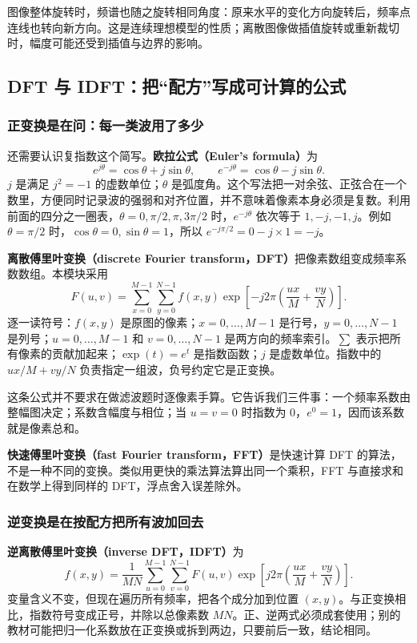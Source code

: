 图像整体旋转时，频谱也随之旋转相同角度：原来水平的变化方向旋转后，频率点连线也转向新方向。这是连续理想模型的性质；离散图像做插值旋转或重新裁切时，幅度可能还受到插值与边界的影响。

\subsection{DFT 与 IDFT：把“配方”写成可计算的公式}

\subsubsection{正变换是在问：每一类波用了多少}
还需要认识复指数这个简写。\textbf{欧拉公式（Euler's formula）}为
\[
e^{j\theta}=\cos\theta+j\sin\theta,\qquad
e^{-j\theta}=\cos\theta-j\sin\theta.
\]
$j$ 是满足 $j^2=-1$ 的虚数单位；$\theta$ 是弧度角。这个写法把一对余弦、正弦合在一个数里，方便同时记录波的强弱和对齐位置，并不意味着像素本身必须是复数。利用前面的四分之一圈表，$\theta=0,\pi/2,\pi,3\pi/2$ 时，$e^{-j\theta}$ 依次等于 $1,-j,-1,j$。例如 $\theta=\pi/2$ 时，$\cos\theta=0,\sin\theta=1$，所以 $e^{-j\pi/2}=0-j\times1=-j$。

\textbf{离散傅里叶变换（discrete Fourier transform，DFT）}把像素数组变成频率系数数组。本模块采用
\[
F(u,v)=\sum_{x=0}^{M-1}\sum_{y=0}^{N-1}
 f(x,y)\exp\!\left[-j2\pi\left(\frac{ux}{M}+\frac{vy}{N}\right)\right].
\]
逐一读符号：$f(x,y)$ 是原图的像素；$x=0,\ldots,M-1$ 是行号，$y=0,\ldots,N-1$ 是列号；$u=0,\ldots,M-1$ 和 $v=0,\ldots,N-1$ 是两方向的频率索引。$\sum$ 表示把所有像素的贡献加起来；$\exp(t)=e^t$ 是指数函数；$j$ 是虚数单位。指数中的 $ux/M+vy/N$ 负责指定一组波，负号约定它是正变换。

这条公式并不要求在做滤波题时逐像素手算。它告诉我们三件事：一个频率系数由整幅图决定；系数含幅度与相位；当 $u=v=0$ 时指数为 0，$e^0=1$，因而该系数就是像素总和。

\textbf{快速傅里叶变换（fast Fourier transform，FFT）}是快速计算 DFT 的算法，不是一种不同的变换。类似用更快的乘法算法算出同一个乘积，FFT 与直接求和在数学上得到同样的 DFT，浮点舍入误差除外。

\subsubsection{逆变换是在按配方把所有波加回去}
\textbf{逆离散傅里叶变换（inverse DFT，IDFT）}为
\[
f(x,y)=\frac{1}{MN}\sum_{u=0}^{M-1}\sum_{v=0}^{N-1}
F(u,v)\exp\!\left[j2\pi\left(\frac{ux}{M}+\frac{vy}{N}\right)\right].
\]
变量含义不变，但现在遍历所有频率，把各个成分加到位置 $(x,y)$。与正变换相比，指数符号变成正号，并除以总像素数 $MN$。正、逆两式必须成套使用；别的教材可能把归一化系数放在正变换或拆到两边，只要前后一致，结论相同。

